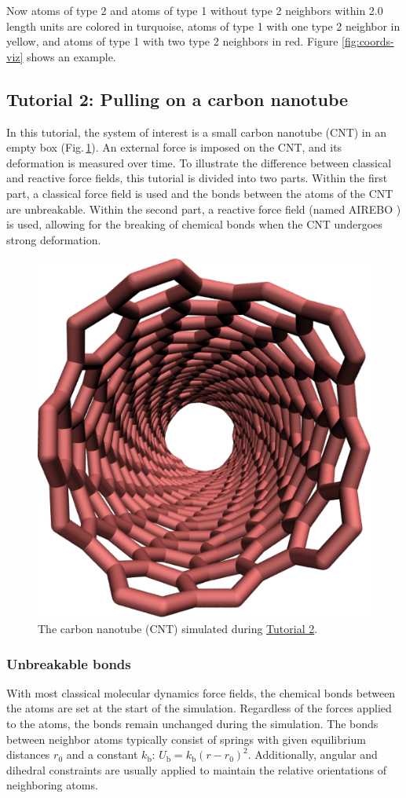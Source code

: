 \documentclass[9pt,tutorial]{livecoms}
\begin{document}
Now atoms of type 2 and atoms of type 1 without type 2 neighbors
within 2.0 length units are colored in turquoise, atoms of type 1 with
one type 2 neighbor in yellow, and atoms of type 1 with two type 2
neighbors in red.  Figure \ref{fig:coords-viz} shows an example.

\subsection{Tutorial 2: Pulling on a carbon nanotube}
\label{carbon-nanotube-label}

In this tutorial, the system of interest is a small carbon nanotube
(CNT) in an empty box (Fig.\,\ref{fig:CNT}). An external force is imposed on
the CNT, and its deformation is measured over time. To illustrate the
difference between classical and reactive force fields, this tutorial is
divided into two parts. Within the first part, a classical force field is
used and the bonds between the atoms of the CNT are unbreakable. Within the
second part, a reactive force field (named AIREBO \cite{stuart2000reactive})
is used, allowing for the breaking of chemical bonds when the CNT undergoes
strong deformation.

\begin{figure}
\centering
\includegraphics[width=0.55\linewidth]{CNT}
\caption{The carbon nanotube (CNT) simulated during
\hyperref[carbon-nanotube-label]{Tutorial 2}.}
\label{fig:CNT}
\end{figure}

\subsubsection{Unbreakable bonds}
With most classical molecular dynamics force fields, the chemical
bonds between the atoms are set at the start of the simulation. Regardless
of the forces applied to the atoms, the bonds remain unchanged during the
simulation. The bonds between neighbor atoms typically consist of springs
with given equilibrium distances $r_0$ and a constant
$k_\text{b}$: $U_\text{b} = k_\text{b} \left( r - r_0 \right)^2$. Additionally, angular and dihedral
constraints are usually applied to maintain the relative orientations of
neighboring atoms.
\end{document}
